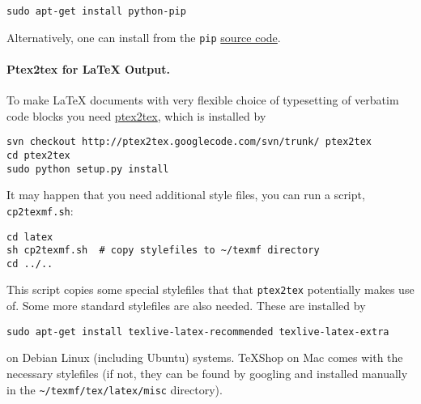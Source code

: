 \documentclass[%
oneside,                 %
final,                   %
10pt]{article}
\begin{document}
\vspace{4pt}
\begin{Verbatim}[numbers=none,frame=lines,label=\fbox{{\tiny Terminal}},fontsize=\fontsize{9pt}{9pt},
labelposition=topline,framesep=2.5mm,framerule=0.7pt]
sudo apt-get install python-pip
\end{Verbatim}
Alternatively, one can install from the {\fontsize{10pt}{10pt}\Verb!pip!} \href{{http://pypi.python.org/pypi/pip}}{source code}.

\paragraph{Ptex2tex for {\LaTeX} Output.}
To make {\LaTeX} documents with very flexible choice of typesetting of
verbatim code blocks you need \href{{http://code.google.com/p/ptex2tex}}{ptex2tex},
which is installed by

\vspace{4pt}
\begin{Verbatim}[numbers=none,frame=lines,label=\fbox{{\tiny Terminal}},fontsize=\fontsize{9pt}{9pt},
labelposition=topline,framesep=2.5mm,framerule=0.7pt]
svn checkout http://ptex2tex.googlecode.com/svn/trunk/ ptex2tex
cd ptex2tex
sudo python setup.py install
\end{Verbatim}
It may happen that you need additional style files, you can run
a script, {\fontsize{10pt}{10pt}\Verb!cp2texmf.sh!}:

\vspace{4pt}
\begin{Verbatim}[numbers=none,frame=lines,label=\fbox{{\tiny Terminal}},fontsize=\fontsize{9pt}{9pt},
labelposition=topline,framesep=2.5mm,framerule=0.7pt]
cd latex
sh cp2texmf.sh  # copy stylefiles to ~/texmf directory
cd ../..
\end{Verbatim}
This script copies some special stylefiles that
that {\fontsize{10pt}{10pt}\Verb!ptex2tex!} potentially makes use of. Some more standard stylefiles
are also needed. These are installed by

\vspace{4pt}
\begin{Verbatim}[numbers=none,frame=lines,label=\fbox{{\tiny Terminal}},fontsize=\fontsize{9pt}{9pt},
labelposition=topline,framesep=2.5mm,framerule=0.7pt]
sudo apt-get install texlive-latex-recommended texlive-latex-extra
\end{Verbatim}
on Debian Linux (including Ubuntu) systems. TeXShop on Mac comes with
the necessary stylefiles (if not, they can be found by googling and installed
manually in the {\fontsize{10pt}{10pt}\Verb!~/texmf/tex/latex/misc!} directory).
\end{document}
